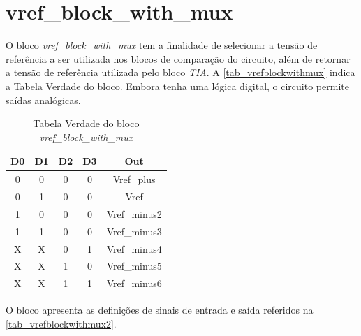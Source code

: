 \renewcommand{\NomeBloco}{\textit{vref\_block\_with\_mux}}
\renewcommand{\NomeBlocoA}{vrefblockwithmux}
\renewcommand{\NomePTab}{tab_\NomeBlocoA}
\renewcommand{\NomeSTab}{tab_\NomeBlocoA2}
\renewcommand{\NomePFig}{fig_\NomeBlocoA}
\renewcommand{\NomeSFig}{fig_\NomeBlocoA2}
\renewcommand{\NomeTTab}{tab_\NomeBlocoA3}

\section{vref\_block\_with\_mux}

O bloco \NomeBloco{} tem a finalidade de selecionar a tensão de refer\^encia a ser utilizada nos blocos de comparação do circuito, al\'em de retornar a tensão de refer\^encia utilizada pelo bloco \textit{TIA}. A \autoref{\NomePTab} indica a Tabela Verdade do bloco. Embora tenha uma l\'ogica digital, o circuito permite sa\'idas anal\'ogicas.

\begin{table}[!h]

\caption{Tabela Verdade do bloco \NomeBloco}%
\label{\NomePTab}
\centering
\begin{tabular}{ccccc}
    \toprule
    D0 & D1 & D2 & D3 & Out \\
    \midrule \midrule
    0 & 0 & 0 & 0 & Vref\_plus\\
    \midrule
    0 & 1 & 0 & 0 & Vref\\
    \midrule
    1 & 0 & 0 & 0 & Vref\_minus2\\
    \midrule
    1 & 1 & 0 & 0 & Vref\_minus3\\
    \midrule
    X & X & 0 & 1 & Vref\_minus4\\
    \midrule
    X & X & 1 & 0 & Vref\_minus5\\
    \midrule
    X & X & 1 & 1 & Vref\_minus6\\
\bottomrule

\end{tabular}
\end{table}

O bloco apresenta as definições de sinais de entrada e sa\'ida referidos na \autoref{\NomeSTab}.

